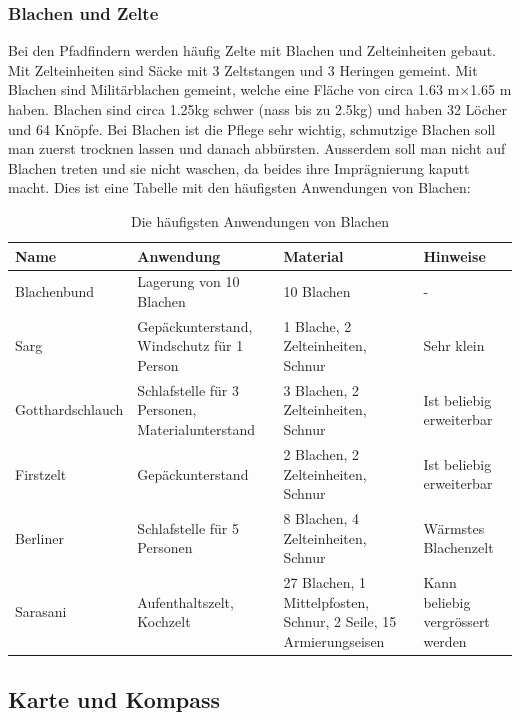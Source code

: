 \subsubsection{Blachen und Zelte}
Bei den Pfadfindern werden häufig Zelte mit Blachen und Zelteinheiten gebaut. Mit Zelteinheiten sind Säcke mit 3 Zeltstangen und 3 Heringen gemeint. Mit Blachen sind Militärblachen gemeint, welche eine Fläche von circa 1.63 m$\times$1.65 m haben. Blachen sind circa 1.25kg schwer (nass bis zu 2.5kg) und haben 32 Löcher und 64 Knöpfe. Bei Blachen ist die Pflege sehr wichtig, schmutzige Blachen soll man zuerst trocknen lassen und danach abbürsten. Ausserdem soll man nicht auf Blachen treten und sie nicht waschen, da beides ihre Imprägnierung kaputt macht. Dies ist eine Tabelle mit den häufigsten Anwendungen von Blachen:

\begin{center}
\begin{table}[h]
\begin{tabularx}{\textwidth}{X|X|X|X}
    \textbf{Name} & \textbf{Anwendung} & \textbf{Material} & \textbf{Hinweise} \\\hline
    Blachenbund & Lagerung von 10 Blachen & 10 Blachen & - \\\hline
    Sarg & Gepäckunterstand, Windschutz für 1 Person & 1 Blache, 2 Zelteinheiten, Schnur & Sehr klein \\\hline
    Gotthardschlauch & Schlafstelle für 3 Personen, Materialunterstand & 3 Blachen, 2 Zelteinheiten, Schnur & Ist beliebig erweiterbar \\\hline
    Firstzelt & Gepäckunterstand & 2 Blachen, 2 Zelteinheiten, Schnur & Ist beliebig erweiterbar \\\hline
    Berliner & Schlafstelle für 5 Personen & 8 Blachen, 4 Zelteinheiten, Schnur & Wärmstes Blachenzelt \\\hline
    Sarasani & Aufenthaltszelt, Kochzelt & 27 Blachen, 1 Mittelpfosten, Schnur, 2 Seile, 15 Armierungseisen & Kann beliebig vergrössert werden \\ 
\end{tabularx}
\caption{Die häufigsten Anwendungen von Blachen}
\end{table}
\end{center}

\subsection*{Karte und Kompass}

